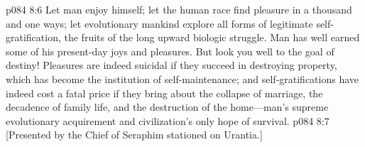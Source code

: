 \pc \vs p084 8:6 Let man enjoy himself; let the human race find pleasure in a thousand and one ways; let evolutionary mankind explore all forms of legitimate self\hyp{}gratification, the fruits of the long upward biologic struggle. Man has well earned some of his present\hyp{}day joys and pleasures. But look you well to the goal of destiny! Pleasures are indeed suicidal if they succeed in destroying property, which has become the institution of self\hyp{}maintenance; and self\hyp{}gratifications have indeed cost a fatal price if they bring about the collapse of marriage, the decadence of family life, and the destruction of the home---man’s supreme evolutionary acquirement and civilization’s only hope of survival.
\vsetoff
\vs p084 8:7 [Presented by the Chief of Seraphim stationed on Urantia.]
